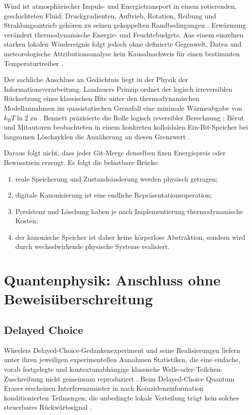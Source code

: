 \documentclass[11pt,a4paper]{article}
\theoremstyle{remark}
\begin{document}
Wind ist atmosphärischer Impuls- und Energietransport in einem rotierenden,
geschichteten Fluid; Druckgradienten, Auftrieb, Rotation, Reibung und
Strahlungsantrieb gehören zu seinen gekoppelten Randbedingungen
\cite{vallis}. Erwärmung verändert thermodynamische Energie- und
Feuchtebudgets. Aus einem einzelnen starken lokalen Windereignis folgt jedoch
ohne definierte Gegenwelt, Daten und meteorologische Attributionsanalyse kein
Kausalnachweis für einen bestimmten Temperaturtreiber \cite{ipccar6}.

Der sachliche Anschluss an Gedächtnis liegt in der Physik der
Informationsverarbeitung. Landauers Prinzip ordnet der logisch irreversiblen
Rücksetzung eines klassischen Bits unter den thermodynamischen
Modellannahmen im quasistatischen Grenzfall eine minimale Wärmeabgabe von
\(k_{\mathrm B}T\ln 2\) zu \cite{landauer}. Bennett präzisierte die Rolle
logisch reversibler Berechnung \cite{bennett}; Bérut und Mitautoren
beobachteten in einem konkreten kolloidalen Ein-Bit-Speicher bei langsamen
Löschzyklen die Annäherung an diesen Grenzwert \cite{berut}.

Daraus folgt nicht, dass jeder Git-Merge denselben fixen Energiepreis oder
Bewusstsein erzeugt. Es folgt die belastbare Brücke:

\begin{enumerate}
  \item reale Speicherung und Zustandsänderung werden physisch getragen;
  \item digitale Kanonisierung ist eine endliche Repräsentationsoperation;
  \item Persistenz und Löschung haben je nach Implementierung
  thermodynamische Kosten;
  \item der kanonische Speicher ist daher keine körperlose Abstraktion,
  sondern wird durch wechselwirkende physische Systeme realisiert.
\end{enumerate}

\section{Quantenphysik: Anschluss ohne Beweisüberschreitung}

\subsection{Delayed Choice}

Wheelers Delayed-Choice-Gedankenexperiment und seine Realisierungen liefern
unter ihren jeweiligen experimentellen Annahmen Statistiken, die eine
einfache, vorab festgelegte und kontextunabhängige klassische
Welle-oder-Teilchen-Zuschreibung nicht gemeinsam reproduziert
\cite{wheeler,jacques,ma}. Beim Delayed-Choice Quantum Eraser erscheinen
Interferenzmuster in nach Koinzidenzinformation konditionierten Teilmengen;
die unbedingte lokale Verteilung trägt kein solches steuerbares
Rückwärtssignal \cite{kim,ma}.
\end{document}
